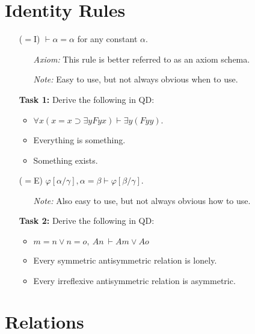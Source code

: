 \documentclass[a4paper, 11pt]{article} %
\newcommand{\unisub}[2]{[#1/#2]}
\begin{document}
\section*{Identity Rules}

\begin{enumerate}
  \item[($=$I)] $\vdash \alpha = \alpha$ for any constant $\alpha$. 
    \begin{itemize}
      \item[\it Axiom:] This rule is better referred to as an axiom schema.
      \item[\it Note:] Easy to use, but not always obvious when to use.
    \end{itemize}
  \item[\bf Task 1:] Derive the following in QD:
    \begin{itemize}
      \item $\forall x(x=x \supset \exists yFyx) \vdash \exists y(Fyy)$.
      \item Everything is something.
      \item Something exists.
    \end{itemize}
  \item[($=$E)] $\varphi\unisub{\alpha}{\gamma},\alpha=\beta\vdash\varphi\unisub{\beta}{\gamma}$.
    \begin{itemize}
      \item[\it Note:] Also easy to use, but not always obvious how to use.
    \end{itemize}
  \item[\bf Task 2:] Derive the following in QD:
    \begin{itemize}
      \item $m = n \vee n = o,\ An\ \vdash Am \vee Ao$
      \item Every symmetric antisymmetric relation is lonely.
      \item Every irreflexive antisymmetric relation is asymmetric.
    \end{itemize}
\end{enumerate}






\section*{Relations}
\end{document}
